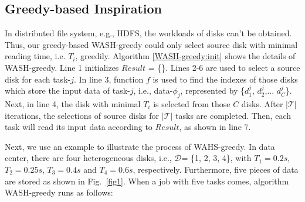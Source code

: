 \documentclass[conference]{IEEEtran}
\begin{document}
\subsection{Greedy-based Inspiration}\label{Heuristic}
In distributed file system, e.g., HDFS, the workloads of disks can't be obtained. Thus, our greedy-based WASH-greedy could only select source disk with minimal reading time, i.e. $T_i$, greedily. 
Algorithm \ref{WASH-greedy:init} shows the details of WASH-greedy. Line 1 initializes $Result$ = \{\}. Lines 2-6 are used to select a source disk for each task-$j$. In line 3, function $f$ is used to find the indexes of those disks which store the input data of task-$j$, i.e., data-$\phi_j$, represented by \{$d_{1}^j$, $d_{2}^j$,... $d_{C}^j$\}. Next, in line 4, the disk with minimal $T_i$ is selected from those $C$ disks. After $\mathcal{|T|}$ iterations, the selections of source disks for $\mathcal{|T|}$ tasks are completed. Then, each task will read its input data according to $Result$, as shown in line 7.



Next, we use an example to illustrate the process of WAHS-greedy. In data center, there are four heterogeneous disks, i.e., $\mathcal{D}$= \{1, 2, 3, 4\}, with $T_1 = 0.2s$,  $T_2 = 0.25s$,  $T_3 = 0.4s$ and $T_4 = 0.6s$, respectively. Furthermore, five pieces of data are stored as shown in Fig.~\ref{fig1}. When a job with five tasks comes, algorithm WASH-greedy runs as follows: %
\end{document}

